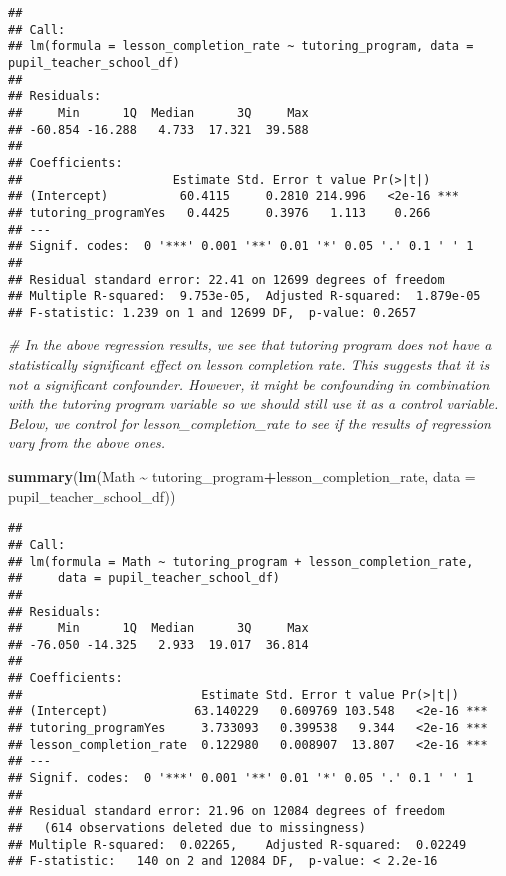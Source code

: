 \documentclass[
]{article}
\newenvironment{Shaded}{\begin{snugshade}}{\end{snugshade}}
\newcommand{\AttributeTok}[1]{\textcolor[rgb]{0.13,0.29,0.53}{#1}}
\newcommand{\CommentTok}[1]{\textcolor[rgb]{0.56,0.35,0.01}{\textit{#1}}}
\newcommand{\FunctionTok}[1]{\textcolor[rgb]{0.13,0.29,0.53}{\textbf{#1}}}
\newcommand{\NormalTok}[1]{#1}
\newcommand{\SpecialCharTok}[1]{\textcolor[rgb]{0.81,0.36,0.00}{\textbf{#1}}}
\begin{document}
\begin{verbatim}
## 
## Call:
## lm(formula = lesson_completion_rate ~ tutoring_program, data = pupil_teacher_school_df)
## 
## Residuals:
##     Min      1Q  Median      3Q     Max 
## -60.854 -16.288   4.733  17.321  39.588 
## 
## Coefficients:
##                     Estimate Std. Error t value Pr(>|t|)    
## (Intercept)          60.4115     0.2810 214.996   <2e-16 ***
## tutoring_programYes   0.4425     0.3976   1.113    0.266    
## ---
## Signif. codes:  0 '***' 0.001 '**' 0.01 '*' 0.05 '.' 0.1 ' ' 1
## 
## Residual standard error: 22.41 on 12699 degrees of freedom
## Multiple R-squared:  9.753e-05,  Adjusted R-squared:  1.879e-05 
## F-statistic: 1.239 on 1 and 12699 DF,  p-value: 0.2657
\end{verbatim}

\begin{Shaded}
\begin{Highlighting}[]
\CommentTok{\# In the above regression results, we see that tutoring program does not have a statistically significant effect on lesson completion rate. This suggests that it is not a significant confounder. However, it might be confounding in combination with the tutoring program variable so we should still use it as a control variable. Below, we control for lesson\_completion\_rate to see if the results of regression vary from the above ones.}
\end{Highlighting}
\end{Shaded}

\begin{Shaded}
\begin{Highlighting}[]
\FunctionTok{summary}\NormalTok{(}\FunctionTok{lm}\NormalTok{(Math }\SpecialCharTok{\textasciitilde{}}\NormalTok{ tutoring\_program}\SpecialCharTok{+}\NormalTok{lesson\_completion\_rate, }\AttributeTok{data =}\NormalTok{ pupil\_teacher\_school\_df))}
\end{Highlighting}
\end{Shaded}

\begin{verbatim}
## 
## Call:
## lm(formula = Math ~ tutoring_program + lesson_completion_rate, 
##     data = pupil_teacher_school_df)
## 
## Residuals:
##     Min      1Q  Median      3Q     Max 
## -76.050 -14.325   2.933  19.017  36.814 
## 
## Coefficients:
##                         Estimate Std. Error t value Pr(>|t|)    
## (Intercept)            63.140229   0.609769 103.548   <2e-16 ***
## tutoring_programYes     3.733093   0.399538   9.344   <2e-16 ***
## lesson_completion_rate  0.122980   0.008907  13.807   <2e-16 ***
## ---
## Signif. codes:  0 '***' 0.001 '**' 0.01 '*' 0.05 '.' 0.1 ' ' 1
## 
## Residual standard error: 21.96 on 12084 degrees of freedom
##   (614 observations deleted due to missingness)
## Multiple R-squared:  0.02265,    Adjusted R-squared:  0.02249 
## F-statistic:   140 on 2 and 12084 DF,  p-value: < 2.2e-16
\end{verbatim}
\end{document}
